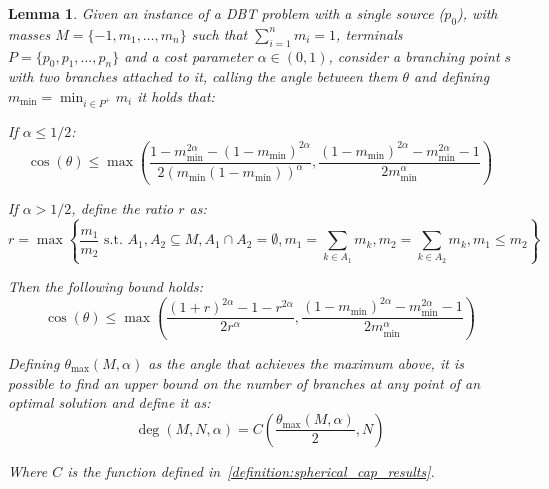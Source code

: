 \documentclass[12pt,a4paper]{article}
\numberwithin{equation}{section}
\theoremstyle{mytheorem}
\newtheorem{lemma}[subsection]{Lemma}
\theoremstyle{myremark}
\theoremstyle{myparagraph}
\begin{document}
    \begin{lemma}
        \label{lemma:degree_definition}
        Given an instance of a DBT problem with a single source ($p_0$), with masses $M=\{-1, m_1, \dots, m_n\}$
        such that $\sum_{i =1}^{n} m_i = 1$, terminals $P=\{p_0, p_1, \dots, p_n\}$ and
        a cost parameter $\alpha \in (0,1)$, consider a branching point $s$ with two branches attached to it,
        calling the angle between them $\theta$ and defining $m_{\min} = \min_{i \in P^+} m_i$ it holds that:

        If $\alpha \le 1/2$:
        \begin{equation}
            \cos(\theta) \le \max\left(
                                     \frac{1 - m_{\min}^{2\alpha} - (1-m_{\min})^{2\alpha}}{2(m_{\min}(1-m_{\min}))^\alpha},
                                     \frac{(1-m_{\min})^{2\alpha} - m_{\min}^{2\alpha} - 1}{2m_{\min}^\alpha}
            \right)
        \end{equation}

        If $\alpha > 1/2$, define the ratio $r$ as:
        \begin{equation}
            \label{eq:ratio_definition}
            r = \max \left\{ \frac{m_1}{m_2} \text{  s.t.  } A_1, A_2 \subseteq M, A_1 \cap A_2 = \emptyset, m_1 = \sum_{k \in A_1} m_k, m_2 = \sum_{k \in A_2} m_k, m_1 \le m_2 \right\}
        \end{equation}

        Then the following bound holds:
        \begin{equation}
            \cos(\theta) \le \max\left(
                                     \frac{ (1+r)^{2\alpha} - 1 - r^{2\alpha}}{2r^\alpha},
                                     \frac{(1-m_{\min})^{2\alpha} - m_{\min}^{2\alpha} - 1}{2m_{\min}^\alpha}
            \right)
        \end{equation}


        Defining $\theta_{\max}(M, \alpha)$ as the angle that achieves the maximum above, it is possible to find an upper bound on the number of branches
        at any point of an optimal solution and define it as:
        \begin{equation}
            \deg(M, N, \alpha) = C\left( \frac{ \theta_{\max}(M, \alpha) }{2}, N\right)
        \end{equation}

        Where $C$ is the function defined in~\ref{definition:spherical_cap_results}.
    \end{lemma}
\end{document}
